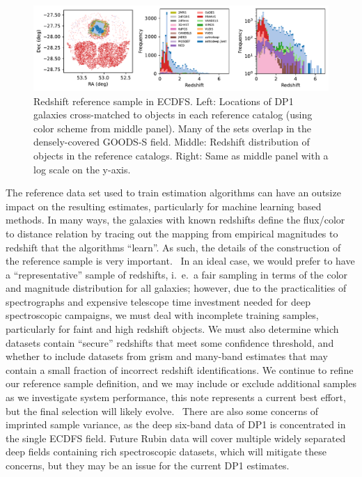 \begin{figure}[b]
    \centering
    \includegraphics[width=\linewidth]{figures/redshift_reference_cat.pdf}
    \caption{
        Redshift reference sample in ECDFS.
        Left: Locations of DP1 galaxies cross-matched to objects in each reference catalog (using color scheme from middle panel).
        Many of the sets overlap in the densely-covered GOODS-S field.
        Middle: Redshift distribution of objects in the reference catalogs.
        Right: Same as middle panel with a log scale on the y-axis.
    }
    \label{fig:reference-sample}
\end{figure}

The reference data set used to train \photoz estimation algorithms can have an outsize impact on the resulting \photoz estimates, particularly for machine learning based methods.  In many ways, the galaxies with known redshifts define the flux/color to distance relation by tracing out the mapping from empirical magnitudes to redshift that the algorithms ``learn''.  As such, the details of the construction of the reference sample is very important.  In an ideal case, we would prefer to have a ``representative'' sample of redshifts, i.~e.~a fair sampling in terms of the color and magnitude distribution for all galaxies; however, due to the practicalities of spectrographs and expensive telescope time investment needed for deep spectroscopic campaigns, we must deal with incomplete training samples, particularly for faint and high redshift objects.  We must also determine which datasets contain ``secure'' redshifts that meet some confidence threshold, and whether to include datasets from grism and many-band \photoz estimates that may contain a small fraction of incorrect redshift identifications.  We continue to refine our reference sample definition, and we may include or exclude additional samples as we investigate system performance, this note represents a current best effort, but the final selection will likely evolve.  There are also some concerns of imprinted sample variance, as the deep six-band data of DP1 is concentrated in the single ECDFS field.  Future Rubin data will cover multiple widely separated deep fields containing rich spectroscopic datasets, which will mitigate these concerns, but they may be an issue for the current DP1 estimates.


